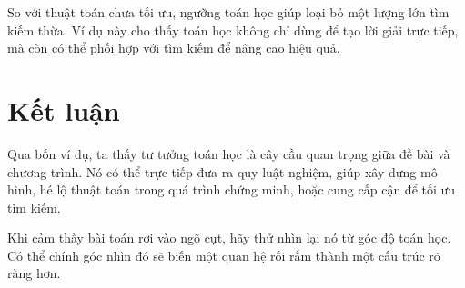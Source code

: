 \documentclass[11pt]{article}
\begin{document}
So với thuật toán chưa tối ưu, ngưỡng toán học giúp loại bỏ một lượng lớn
tìm kiếm thừa. Ví dụ này cho thấy toán học không chỉ dùng để tạo lời giải
trực tiếp, mà còn có thể phối hợp với tìm kiếm để nâng cao hiệu quả.

\section{Kết luận}

Qua bốn ví dụ, ta thấy tư tưởng toán học là cây cầu quan trọng giữa đề bài và
chương trình. Nó có thể trực tiếp đưa ra quy luật nghiệm, giúp xây dựng mô
hình, hé lộ thuật toán trong quá trình chứng minh, hoặc cung cấp cận để tối
ưu tìm kiếm.

Khi cảm thấy bài toán rơi vào ngõ cụt, hãy thử nhìn lại nó từ góc độ toán
học. Có thể chính góc nhìn đó sẽ biến một quan hệ rối rắm thành một cấu trúc
rõ ràng hơn.
\end{document}
